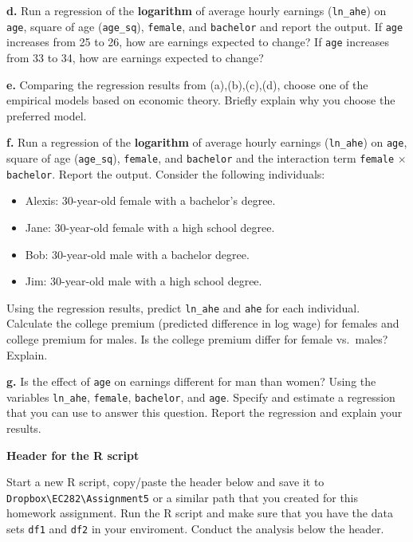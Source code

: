 \documentclass[]{book}
\providecommand{\tightlist}{%
  \setlength{\itemsep}{0pt}\setlength{\parskip}{0pt}}
\begin{document}
\textbf{d.} Run a regression of the \textbf{logarithm} of average hourly
earnings (\texttt{ln\_ahe}) on \texttt{age}, square of age
(\texttt{age\_sq}), \texttt{female}, and \texttt{bachelor} and report
the output. If \texttt{age} increases from 25 to 26, how are earnings
expected to change? If \texttt{age} increases from 33 to 34, how are
earnings expected to change?

\textbf{e.} Comparing the regression results from (a),(b),(c),(d),
choose one of the empirical models based on economic theory. Briefly
explain why you choose the preferred model.

\textbf{f.} Run a regression of the \textbf{logarithm} of average hourly
earnings (\texttt{ln\_ahe}) on \texttt{age}, square of age
(\texttt{age\_sq}), \texttt{female}, and \texttt{bachelor} and the
interaction term \texttt{female} \(\times\) \texttt{bachelor}. Report
the output. Consider the following individuals:

\begin{itemize}
\tightlist
\item
  Alexis: 30-year-old female with a bachelor's degree.
\item
  Jane: 30-year-old female with a high school degree.
\item
  Bob: 30-year-old male with a bachelor degree.
\item
  Jim: 30-year-old male with a high school degree.
\end{itemize}

Using the regression results, predict \texttt{ln\_ahe} and \texttt{ahe}
for each individual. Calculate the college premium (predicted difference
in log wage) for females and college premium for males. Is the college
premium differ for female vs.~males? Explain.

\textbf{g.} Is the effect of \texttt{age} on earnings different for man
than women? Using the variables \texttt{ln\_ahe}, \texttt{female},
\texttt{bachelor}, and \texttt{age}. Specify and estimate a regression
that you can use to answer this question. Report the regression and
explain your results.

\textbf{Header for the R script}

Start a new R script, copy/paste the header below and save it to
\texttt{Dropbox\textbackslash{}EC282\textbackslash{}Assignment5} or a
similar path that you created for this homework assignment. Run the R
script and make sure that you have the data sets \texttt{df1} and
\texttt{df2} in your enviroment. Conduct the analysis below the header.
\end{document}
